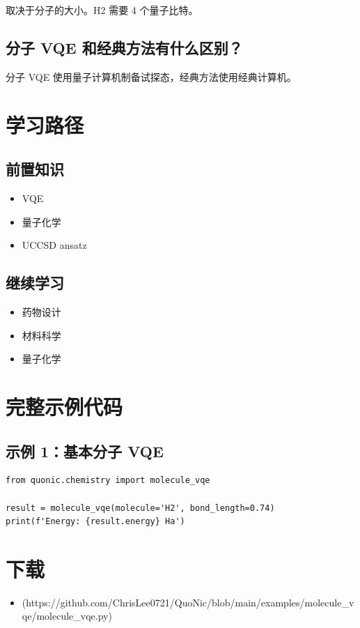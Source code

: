 \documentclass[12pt,a4paper]{article}
\begin{document}
取决于分子的大小。H2 需要 4 个量子比特。

\subsection{分子 VQE 和经典方法有什么区别？}

分子 VQE 使用量子计算机制备试探态，经典方法使用经典计算机。

\section{学习路径}

\subsection{前置知识}
\begin{itemize}
  \item VQE
  \item 量子化学
  \item UCCSD ansatz
\end{itemize}

\subsection{继续学习}
\begin{itemize}
  \item 药物设计
  \item 材料科学
  \item 量子化学
\end{itemize}

\section{完整示例代码}

\subsection{示例 1：基本分子 VQE}

\begin{verbatim}
from quonic.chemistry import molecule_vqe

result = molecule_vqe(molecule='H2', bond_length=0.74)
print(f'Energy: {result.energy} Ha')
\end{verbatim}

\section{下载}

\begin{itemize}
  \item [molecule\_vqe.py](https://github.com/ChrisLee0721/QuoNic/blob/main/examples/molecule_vqe/molecule_vqe.py)
\end{itemize}
\end{document}
